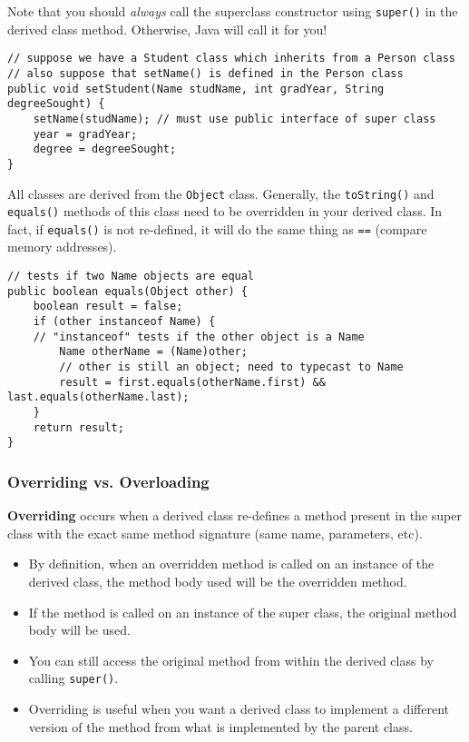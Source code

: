 \documentclass{article}
\begin{document}
\begin{flushleft}
Note that you should \textit{always} call the superclass constructor using \texttt{super()} in the derived class method. Otherwise, Java will call it for you!

\begin{verbatim}
// suppose we have a Student class which inherits from a Person class
// also suppose that setName() is defined in the Person class
public void setStudent(Name studName, int gradYear, String degreeSought) {
    setName(studName); // must use public interface of super class
    year = gradYear;
    degree = degreeSought;
}
\end{verbatim}

All classes are derived from the \texttt{Object} class. Generally, the \texttt{toString()} and \texttt{equals()} methods of this class need to be overridden in your derived class. In fact, if \texttt{equals()} is not re-defined, it will do the same thing as \texttt{==} (compare memory addresses). 

\begin{verbatim}
// tests if two Name objects are equal
public boolean equals(Object other) {
    boolean result = false;
    if (other instanceof Name) { 
    // "instanceof" tests if the other object is a Name
        Name otherName = (Name)other; 
        // other is still an object; need to typecast to Name
        result = first.equals(otherName.first) && last.equals(otherName.last);
    }
    return result;
}
\end{verbatim}

\subsubsection{Overriding vs. Overloading}

\textbf{Overriding} occurs when a derived class re-defines a method present in the super class with the exact same method signature (same name, parameters, etc). 

\begin{itemize}
    \item By definition, when an overridden method is called on an instance of the derived class, the method body used will be the overridden method.
    \item If the method is called on an instance of the super class, the original method body will be used.
    \item You can still access the original method from within the derived class by calling \texttt{super()}.
    \item Overriding is useful when you want a derived class to implement a different version of the method from what is implemented by the parent class.
\end{itemize}


\end{flushleft}
\end{document}
